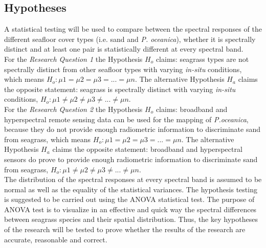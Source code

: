 \documentclass[11pt]{article}
\begin{document}
\subsection{Hypotheses}
A statistical testing will be used to compare between the spectral responses of the different seafloor cover types (i.e. sand and \textit{P. oceanica}),
 whether it is spectrally distinct and at least one pair is statistically different at every spectral
band.\vspace{1ex}\\
For the \emph{Research Question 1} the Hypothesis $H_o$ claims: seagrass types are not spectrally distinct from other seafloor types with
varying \textit{in-situ} conditions, which means $H_o: \mu1 =\mu2 =\mu3=...= \mu n$.
The alternative Hypothesis $H_a$ claims the opposite statement: seagrass is spectrally
distinct with varying \textit{in-situ} conditions, $H_o:\mu1\neq\mu2\neq\mu3\neq...\neq\mu n$.\vspace{1ex}\\
For the \emph{Research Question 2} the Hypothesis $H_o$ claims: broadband and hyperspectral remote sensing data can be used for the mapping of \textit{P.oceanica}, because they do not provide enough radiometric information to discriminate sand from seagrass, which means $H_o:\mu1=\mu2=\mu3=...=\mu n$. The alternative Hypothesis $H_a$ claims the opposite statement: broadband and hyperspectral sensors do prove to provide enough radiometric information to discriminate sand from seagrass, 
$H_o: \mu1\neq\mu2\neq\mu3\neq ... \neq\mu n$.\vspace{1ex}\\
The distribution of the spectral responses at every spectral band is assumed to be normal as well as
the equality of the statistical variances.
The hypothesis testing is suggested to be carried out using the \ac{ANOVA} statistical test. The purpose of
\ac{ANOVA} test is to visualize in an effective and quick way the spectral differences between seagrass
species and their spatial distribution. Thus, the key hypotheses of the research will be tested to prove
whether the results of the research are accurate, reasonable and correct.
\end{document}
